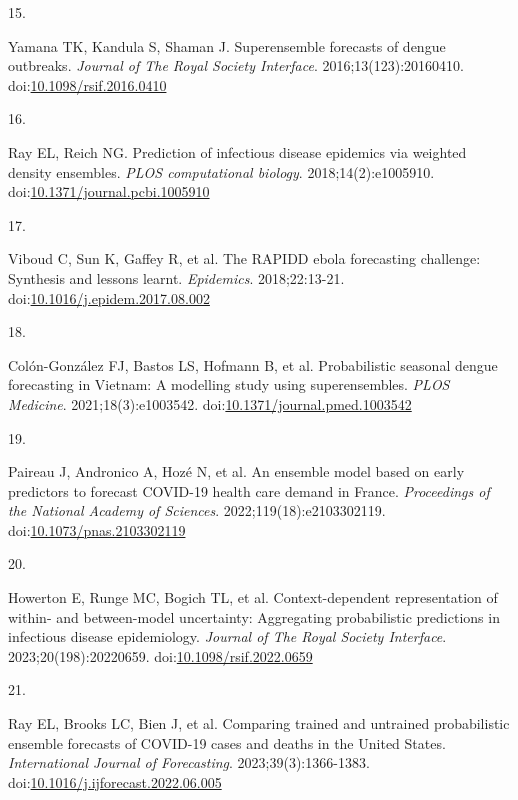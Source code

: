 \documentclass[
  letterpaper,
  DIV=11,
  numbers=noendperiod]{scrartcl}
\newlength{\cslhangindent}
\newlength{\csllabelwidth}
\newenvironment{CSLReferences}[2] %
 {\begin{list}{}{%
  \setlength{\itemindent}{0pt}
  \setlength{\leftmargin}{0pt}
  \setlength{\parsep}{0pt}
  \ifodd #1
   \setlength{\leftmargin}{\cslhangindent}
   \setlength{\itemindent}{-1\cslhangindent}
  \fi
  \setlength{\itemsep}{#2\baselineskip}}}
 {\end{list}}
\newcommand{\CSLLeftMargin}[1]{\parbox[t]{\csllabelwidth}{\strut#1\strut}}
\newcommand{\CSLRightInline}[1]{\parbox[t]{\linewidth - \csllabelwidth}{\strut#1\strut}}
\begin{document}
\begin{CSLReferences}{0}{1}
\CSLLeftMargin{15. }%
\CSLRightInline{Yamana TK, Kandula S, Shaman J. Superensemble forecasts
of dengue outbreaks. \emph{Journal of The Royal Society Interface}.
2016;13(123):20160410.
doi:\href{https://doi.org/10.1098/rsif.2016.0410}{10.1098/rsif.2016.0410}}

\CSLLeftMargin{16. }%
\CSLRightInline{Ray EL, Reich NG. Prediction of infectious disease
epidemics via weighted density ensembles. \emph{PLOS computational
biology}. 2018;14(2):e1005910.
doi:\href{https://doi.org/10.1371/journal.pcbi.1005910}{10.1371/journal.pcbi.1005910}}

\CSLLeftMargin{17. }%
\CSLRightInline{Viboud C, Sun K, Gaffey R, et al. The RAPIDD ebola
forecasting challenge: Synthesis and lessons learnt. \emph{Epidemics}.
2018;22:13-21.
doi:\href{https://doi.org/10.1016/j.epidem.2017.08.002}{10.1016/j.epidem.2017.08.002}}

\CSLLeftMargin{18. }%
\CSLRightInline{Colón-González FJ, Bastos LS, Hofmann B, et al.
Probabilistic seasonal dengue forecasting in {Vietnam}: {A} modelling
study using superensembles. \emph{PLOS Medicine}. 2021;18(3):e1003542.
doi:\href{https://doi.org/10.1371/journal.pmed.1003542}{10.1371/journal.pmed.1003542}}

\CSLLeftMargin{19. }%
\CSLRightInline{Paireau J, Andronico A, Hozé N, et al. An ensemble model
based on early predictors to forecast {COVID}-19 health care demand in
{France}. \emph{Proceedings of the National Academy of Sciences}.
2022;119(18):e2103302119.
doi:\href{https://doi.org/10.1073/pnas.2103302119}{10.1073/pnas.2103302119}}

\CSLLeftMargin{20. }%
\CSLRightInline{Howerton E, Runge MC, Bogich TL, et al.
Context-dependent representation of within- and between-model
uncertainty: Aggregating probabilistic predictions in infectious disease
epidemiology. \emph{Journal of The Royal Society Interface}.
2023;20(198):20220659.
doi:\href{https://doi.org/10.1098/rsif.2022.0659}{10.1098/rsif.2022.0659}}

\CSLLeftMargin{21. }%
\CSLRightInline{Ray EL, Brooks LC, Bien J, et al. Comparing trained and
untrained probabilistic ensemble forecasts of {COVID}-19 cases and
deaths in the {United} {States}. \emph{International Journal of
Forecasting}. 2023;39(3):1366-1383.
doi:\href{https://doi.org/10.1016/j.ijforecast.2022.06.005}{10.1016/j.ijforecast.2022.06.005}}


\end{CSLReferences}
\end{document}
